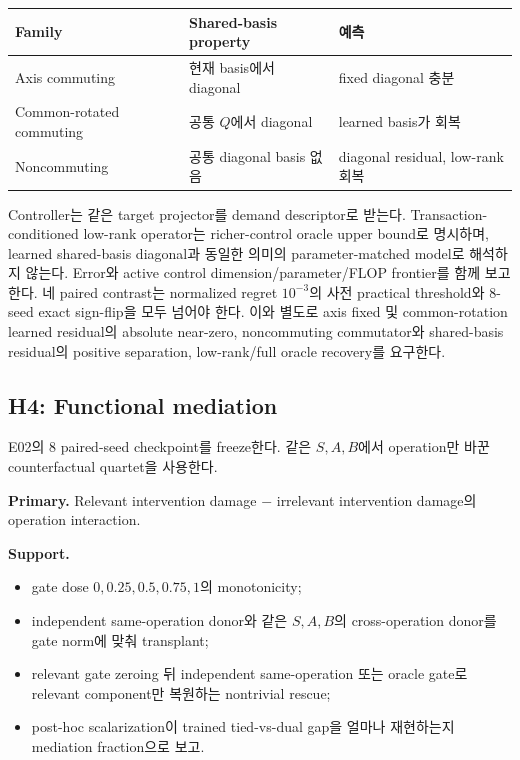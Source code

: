 \documentclass[10.5pt,a4paper]{article}
\begin{document}
\begin{center}
\begin{tabular}{lll}
\toprule
Family & Shared-basis property & 예측 \\
\midrule
Axis commuting & 현재 basis에서 diagonal & fixed diagonal 충분 \\
Common-rotated commuting & 공통 $Q$에서 diagonal & learned basis가 회복 \\
Noncommuting & 공통 diagonal basis 없음 & diagonal residual, low-rank 회복 \\
\bottomrule
\end{tabular}
\end{center}

Controller는 같은 target projector를 demand descriptor로 받는다. Transaction-conditioned low-rank operator는 richer-control oracle upper bound로 명시하며, learned shared-basis diagonal과 동일한 의미의 parameter-matched model로 해석하지 않는다. Error와 active control dimension/parameter/FLOP frontier를 함께 보고한다. 네 paired contrast는 normalized regret $10^{-3}$의 사전 practical threshold와 8-seed exact sign-flip을 모두 넘어야 한다. 이와 별도로 axis fixed 및 common-rotation learned residual의 absolute near-zero, noncommuting commutator와 shared-basis residual의 positive separation, low-rank/full oracle recovery를 요구한다.

\subsection{H4: Functional mediation}
E02의 8 paired-seed checkpoint를 freeze한다. 같은 $S,A,B$에서 operation만 바꾼 counterfactual quartet을 사용한다.

\textbf{Primary.} Relevant intervention damage $-$ irrelevant intervention damage의 operation interaction.

\textbf{Support.}
\begin{itemize}
\item gate dose $0,0.25,0.5,0.75,1$의 monotonicity;
\item independent same-operation donor와 같은 $S,A,B$의 cross-operation donor를 gate norm에 맞춰 transplant;
\item relevant gate zeroing 뒤 independent same-operation 또는 oracle gate로 relevant component만 복원하는 nontrivial rescue;
\item post-hoc scalarization이 trained tied-vs-dual gap을 얼마나 재현하는지 mediation fraction으로 보고.
\end{itemize}
\end{document}
